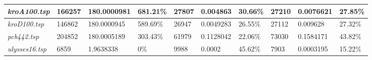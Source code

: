 \begin{landscape}
\begin{table}[]
\begin{tabular}{|l|l|l|l|l|l|l|l|l|l|}
  \textit{kroA100.tsp}                                    & 166257                                  & 180.0000981                                                                           & 681.21\%                                                                                & 27807                                   & 0.004863                                                                               & 30.66\%                                                                                 & 27210                                   & 0.0076621                                                                             & 27.85\%                                                                                 \\ \hline
  \textit{kroD100.tsp}                                    & 146862                                  & 180.0000945                                                                           & 589.69\%                                                                                & 26947                                   & 0.0049283                                                                              & 26.55\%                                                                                 & 27112                                   & 0.009628                                                                              & 27.32\%                                                                                 \\ \hline
  \textit{pcb442.tsp}                                     & 204852                                  & 180.0005189                                                                           & 303.43\%                                                                                & 61979                                   & 0.1128042                                                                              & 22.06\%                                                                                 & 73030                                   & 0.1584171                                                                             & 43.82\%                                                                                 \\ \hline
  \textit{ulysses16.tsp}                                  & 6859                                    & 1.9638338                                                                             & 0\%                                                                                     & 9988                                    & 0.0002                                                                                 & 45.62\%                                                                                 & 7903                                    & 0.0003195                                                                             & 15.22\%                                                                                 \\ \hline

\end{tabular}
\end{table}
\end{landscape}
